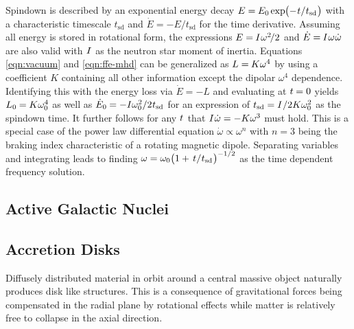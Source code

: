 Spindown is described by an exponential energy decay $E = \kern-0.3pt E_0 \kern-0.2pt \exp \kern-2.0pt
\smash{\bigl( - \kern+0.5pt t \kern+0.1pt / \kern+0.2pt t_\text{sd} \kern+0.5pt \bigr)}$ with a characteristic timescale
$t_\text{sd}$ and $\dot{E} = - E / t_\text{sd}$ for the time derivative. Assuming all energy is stored in
rotational form, the expressions $E = \kern-0.5pt I \kern+0.5pt \omega^2 \kern-1.5pt / 2$ and
$\dot{E} = \kern-0.5pt I \kern+0.5pt \omega \kern+0.5pt \dot{\omega}$ are also valid with $I \kern+0.5pt$ as the neutron star
moment of inertia. Equations \eqref{eqn:vacuum} and \eqref{eqn:ffe-mhd} can be generalized as $L = \kern-0.5pt K \omega^4$ by
using a coefficient $K$ containing all other information except the dipolar $\omega^4$ dependence. Identifying this with the energy
loss via $\dot{E} = -L$ and evaluating at $t \kern-0.3pt= 0$ yields $L_0 \kern-0.3pt = \kern-0.2pt K \omega_0^4$ as well as
$\dot{E}_0 \kern-0.3pt = -I \omega_0^2 / 2 \kern+0.4pt t_\text{sd}$ for an expression of
$t_\text{sd} = I \kern+0.5pt / 2K\omega_0^2$ as the spindown time. It further follows for any $t \kern+0.5pt$ that
$I \kern+0.5pt \dot{\omega} = -K \omega^3$ must hold. This is a special case of the power law differential equation
$\dot{\omega} \propto \omega^n$ with $n = 3$ being the braking index characteristic of a rotating magnetic dipole. Separating
variables and integrating leads to finding
$\omega = \omega_0 \smash{\bigl( 1 + \kern+1.5pt t \kern+0.1pt / \kern+0.2pt t_\text{sd} \kern+0.5pt \bigr)^{-1/2}}$
as the time dependent frequency solution.



\subsection{Active Galactic Nuclei}
\label{sub:nuclei}



\subsection{Accretion Disks}
\label{sub:accretion}

Diffusely distributed material in orbit around a central massive object naturally produces disk like structures. This is a
consequence of gravitational forces being compensated in the radial plane by rotational effects while matter is relatively
free to collapse in the axial direction. 


\newpage


